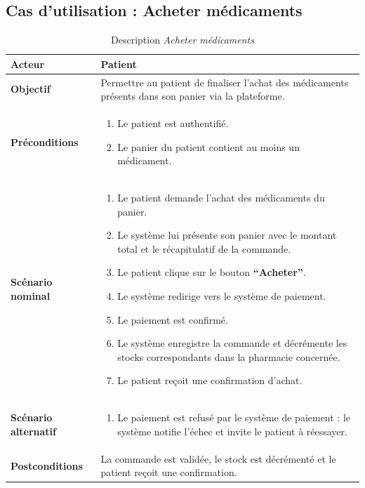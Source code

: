 \documentclass[12pt,a4paper]{report}
\begin{document}
\subsection*{Cas d'utilisation : Acheter médicaments}

\begin{table}[H]
    \centering
    \begin{tabular}{|p{4cm}|p{9cm}|}
        \hline
        \textbf{Acteur} & Patient \\
        \hline
        \textbf{Objectif} & Permettre au patient de finaliser l'achat des médicaments présents dans son panier via la plateforme. \\
        \hline
        \textbf{Préconditions} &
        \begin{enumerate}
            \item Le patient est authentifié.
            \item Le panier du patient contient au moins un médicament.
        \end{enumerate} \\
        \hline
        \textbf{Scénario nominal} &
        \begin{enumerate}
            \item Le patient demande l'achat des médicaments du panier.
            \item Le système lui présente son panier avec le montant total et le récapitulatif de la commande.
            \item Le patient clique sur le bouton \textbf{``Acheter''}.
            \item Le système redirige vers le système de paiement.
            \item Le paiement est confirmé.
            \item Le système enregistre la commande et décrémente les stocks correspondants dans la pharmacie concernée.
            \item Le patient reçoit une confirmation d'achat.
        \end{enumerate} \\
        \hline
        \textbf{Scénario alternatif} &
        \begin{enumerate}
            \item[5.a] Le paiement est refusé par le système de paiement : le système notifie l'échec et invite le patient à réessayer.
        \end{enumerate} \\
        \hline
        \textbf{Postconditions} & La commande est validée, le stock est décrémenté et le patient reçoit une confirmation. \\
        \hline
    \end{tabular}
    \caption{Description \textit{Acheter médicaments}}
\end{table}
\end{document}
